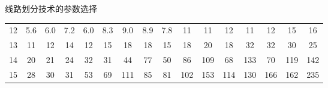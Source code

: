 \documentclass[aspectratio=1610]{ctexbeamer}
\begin{document}
\begin{frame}{线路划分技术的参数选择}
\begin{table}[!htbp]
{\begin{tabular}{c|ccccccccccccccc}
            \rowcolor[HTML]{FFFFFF} 
            12                         & 5.6                                              & 6.0                         & 7.2                         & 6.0                         & 8.3                         & 9.0                                              & 8.9                        & 7.8                         & \cellcolor[HTML]{8DB4E2}11  & \cellcolor[HTML]{8DB4E2}11  & \cellcolor[HTML]{8DB4E2}12  & \cellcolor[HTML]{8DB4E2}11  & \cellcolor[HTML]{8DB4E2}12  & \cellcolor[HTML]{8DB4E2}15  & \cellcolor[HTML]{8DB4E2}16  \\
            \rowcolor[HTML]{8DB4E2} 
            \cellcolor[HTML]{FFFFFF}13 & 11                                               & 12                          & 14                          & 12                          & 15                          & 18                                               & 18                         & 15                          & 18                          & 20                          & 18                          & 32                          & 32                          & 30                          & 25                          \\
            \rowcolor[HTML]{8DB4E2} 
            \cellcolor[HTML]{FFFFFF}14 & 20                                               & 21                          & 24                          & 32                          & 31                          & 44                                               & 77                         & 50                          & 86                          & \cellcolor[HTML]{538DD5}109 & 68                          & \cellcolor[HTML]{538DD5}133 & 70                          & \cellcolor[HTML]{538DD5}119 & \cellcolor[HTML]{538DD5}142 \\
            \rowcolor[HTML]{538DD5} 
            \cellcolor[HTML]{FFFFFF}15 & \cellcolor[HTML]{8DB4E2}28                       & \cellcolor[HTML]{8DB4E2}30  & \cellcolor[HTML]{8DB4E2}31  & \cellcolor[HTML]{8DB4E2}53  & \cellcolor[HTML]{8DB4E2}69  & 111                                              & \cellcolor[HTML]{8DB4E2}85 & \cellcolor[HTML]{8DB4E2}81  & 102                         & 153                         & 114                         & 130                         & 166                         & 162                         & 235                        
                             
            \end{tabular}
        }
    \end{table}   
\end{frame}
\end{document}
